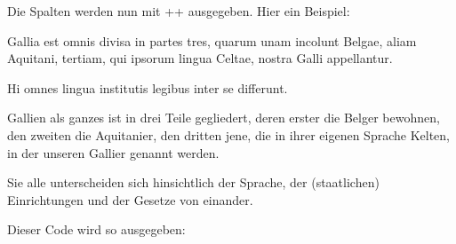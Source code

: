 Die Spalten werden nun mit +\Columns+ ausgegeben. Hier ein Beispiel:



\begin{lfgwcode}{}
\begin{pairs}
\begin{Leftside}
\beginnumbering
\autopar
{}

Gallia est omnis divisa in partes tres, 
    quarum unam incolunt Belgae,
    aliam Aquitani,
    tertiam, qui ipsorum lingua Celtae, nostra Galli appellantur.

Hi omnes lingua institutis legibus inter se differunt.

\endnumbering
\end{Leftside}

\begin{Rightside}
\beginnumbering
\autopar

Gallien als ganzes ist in drei Teile gegliedert,
    deren erster die Belger bewohnen,
    den zweiten die Aquitanier,
    den dritten jene, die in ihrer eigenen Sprache Kelten, in der unseren Gallier genannt werden.

Sie alle unterscheiden sich hinsichtlich der Sprache, 
    der (staatlichen) Einrichtungen und der Gesetze von einander.
    
\endnumbering
\end{Rightside}
\end{pairs}

\Columns
\end{lfgwcode}

Dieser Code wird so ausgegeben:

\setlength{\Lcolwidth}{0.425\textwidth}
\setlength{\Rcolwidth}{0.425\textwidth}

